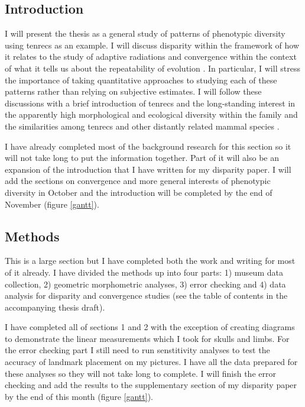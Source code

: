 \documentclass[12pt,a4paper]{article}
\begin{document}
\subsection{Introduction}

	I will present the thesis as a general study of patterns of phenotypic diversity using tenrecs as an example.
	I will discuss disparity within the framework of how it relates to the study of adaptive radiations \citep{Losos2010a} and convergence within the context of what it tells us about the repeatability of evolution \citep[e.g][]{Blount2008}. In particular, I will stress the importance of taking quantitative approaches to studying each of these patterns rather than relying on subjective estimates. I will follow these discussions with a brief introduction of tenrecs and the long-standing interest in the apparently high morphological and ecological diversity within the family and the similarities among tenrecs and other distantly related mammal species \citep[e.g.][]{Eisenberg1969, Soarimalala2011, Olson2013}. 

	I have already completed most of the background research for this section so it will not take long to put the information together. Part of it will also be an expansion of the introduction that I have written for my disparity paper. I will add the sections on convergence and more general interests of phenotypic diversity in October and the introduction will be completed by the end of November (figure \ref*{gantt}).

\subsection{Methods}

	This is a large section but I have completed both the work and writing for most of it already.
	I have divided the methods up into four parts: 1) museum data collection, 2) geometric morphometric analyses, 3) error checking and 4) data analysis for disparity and convergence studies (see the table of contents in the accompanying thesis draft).

	I have completed all of sections 1 and 2 with the exception of creating diagrams to demonstrate the linear measurements which I took for skulls and limbs. For the error checking part I still need to run senstitivity analyses to test the accuracy of landmark placement on my pictures. I have all the data prepared for these analyses so they will not take long to complete. I will finish the error checking and add the results to the supplementary section of my disparity paper by the end of this month (figure \ref{gantt}).
	
\end{document}
